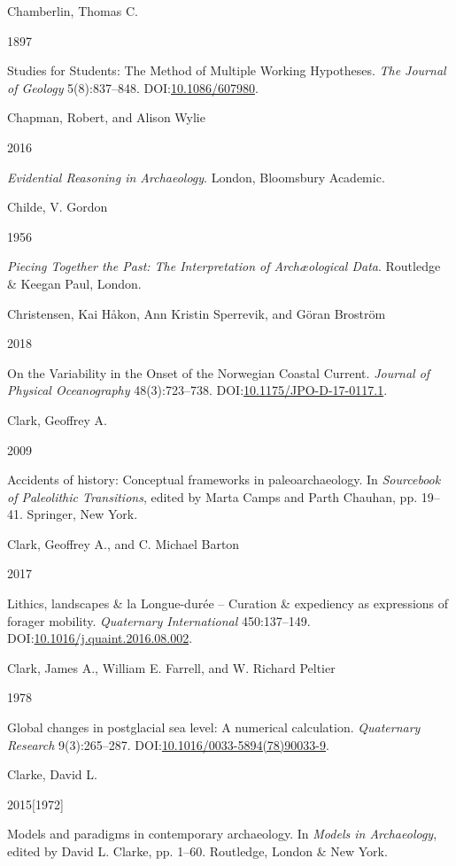 \documentclass[
  12pt,
  a4paper,
  oneside]{book}
\newlength{\cslhangindent}
\newlength{\csllabelwidth}
\newlength{\cslentryspacingunit} %
\newenvironment{CSLReferences}[2] %
 {%
  \setlength{\parindent}{0pt}
  \ifodd #1
  \let\oldpar\par
  \def\par{\hangindent=\cslhangindent\oldpar}
  \fi
  \setlength{\parskip}{#2\cslentryspacingunit}
 }%
 {}
\newcommand{\CSLBlock}[1]{#1\hfill\break}
\newcommand{\CSLLeftMargin}[1]{\parbox[t]{\csllabelwidth}{#1}}
\newcommand{\CSLRightInline}[1]{\parbox[t]{\linewidth - \csllabelwidth}{#1}\break}
\begin{document}
\begin{CSLReferences}{0}{0}
\leavevmode{}%
\CSLBlock{Chamberlin, Thomas C.}
\CSLLeftMargin{ 1897}%
\CSLRightInline{{Studies for Students: The Method of Multiple Working Hypotheses}. \emph{The Journal of Geology} 5(8):837--848. DOI:\href{https://doi.org/10.1086/607980}{10.1086/607980}.}

\leavevmode{}%
\CSLBlock{Chapman, Robert, and Alison Wylie}
\CSLLeftMargin{ 2016}%
\CSLRightInline{\emph{{Evidential Reasoning in Archaeology}}. London, Bloomsbury Academic.}

\leavevmode{}%
\CSLBlock{Childe, V. Gordon}
\CSLLeftMargin{ 1956}%
\CSLRightInline{\emph{{Piecing Together the Past: The Interpretation of Archæological Data}}. Routledge \& Keegan Paul, London.}

\leavevmode{}%
\CSLBlock{Christensen, Kai Håkon, Ann Kristin Sperrevik, and Göran Broström}
\CSLLeftMargin{ 2018}%
\CSLRightInline{{On the Variability in the Onset of the Norwegian Coastal Current}. \emph{Journal of Physical Oceanography} 48(3):723--738. DOI:\href{https://doi.org/10.1175/JPO-D-17-0117.1}{10.1175/JPO-D-17-0117.1}.}

\leavevmode{}%
\CSLBlock{Clark, Geoffrey A.}
\CSLLeftMargin{ 2009}%
\CSLRightInline{Accidents of history: Conceptual frameworks in paleoarchaeology. In \emph{{Sourcebook of Paleolithic Transitions}}, edited by Marta Camps and Parth Chauhan, pp. 19--41. Springer, New York.}

\leavevmode{}%
\CSLBlock{Clark, Geoffrey A., and C. Michael Barton}
\CSLLeftMargin{ 2017}%
\CSLRightInline{Lithics, landscapes \& la Longue-durée -- Curation \& expediency as expressions of forager mobility. \emph{Quaternary International} 450:137--149. DOI:\href{https://doi.org/10.1016/j.quaint.2016.08.002}{10.1016/j.quaint.2016.08.002}.}

\leavevmode{}%
\CSLBlock{Clark, James A., William E. Farrell, and W. Richard Peltier}
\CSLLeftMargin{ 1978}%
\CSLRightInline{{Global changes in postglacial sea level: A numerical calculation}. \emph{Quaternary Research} 9(3):265--287. DOI:\href{https://doi.org/10.1016/0033-5894(78)90033-9}{10.1016/0033-5894(78)90033-9}.}

\leavevmode{}%
\CSLBlock{Clarke, David L.}
\CSLLeftMargin{ 2015{[}1972{]}}%
\CSLRightInline{{Models and paradigms in contemporary archaeology}. In \emph{{Models in Archaeology}}, edited by David L. Clarke, pp. 1--60. Routledge, London \& New York.}


\end{CSLReferences}
\end{document}
